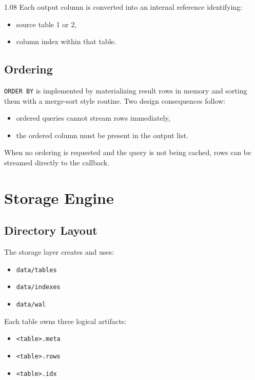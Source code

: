 \documentclass[11pt,a4paper]{article}
\begin{document}
\begin{spacing}{1.08}
Each output column is converted into an internal reference identifying:

\begin{itemize}
    \item source table 1 or 2,
    \item column index within that table.
\end{itemize}

\subsection{Ordering}

\texttt{ORDER BY} is implemented by materializing result rows in memory and sorting them with a merge-sort style routine. Two design consequences follow:

\begin{itemize}
    \item ordered queries cannot stream rows immediately,
    \item the ordered column must be present in the output list.
\end{itemize}

When no ordering is requested and the query is not being cached, rows can be streamed directly to the callback.

\section{Storage Engine}

\subsection{Directory Layout}

The storage layer creates and uses:

\begin{itemize}
    \item \texttt{data/tables}
    \item \texttt{data/indexes}
    \item \texttt{data/wal}
\end{itemize}

Each table owns three logical artifacts:

\begin{itemize}
    \item \texttt{<table>.meta}
    \item \texttt{<table>.rows}
    \item \texttt{<table>.idx}
\end{itemize}


\end{spacing}
\end{document}
